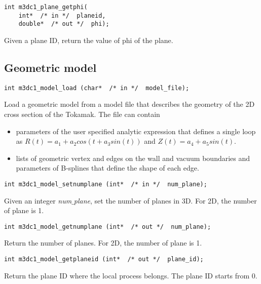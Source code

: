 \begin{verbatim}
int m3dc1_plane_getphi(
    int*  /* in */  planeid, 
    double*  /* out */  phi);
\end{verbatim}\vspace{-.5cm}\hspace{1cm}
Given a plane ID, return the value of phi of the plane.

\subsection{Geometric model}

\begin{verbatim}
int m3dc1_model_load (char*  /* in */  model_file);
\end{verbatim}\vspace{-.5cm}\hspace{1cm}
Load a geometric model from a model file that describes the geometry of the 2D cross section of the Tokamak. The file can contain
\begin{itemize}
\item parameters of the user specified analytic expression that defines a single loop as $R(t)=a_1 + a_2cos\left(t + a_3sin(t)\right)$ and $Z(t)= a_4 + a_5sin(t)$.
\item lists of geometric vertex and edges on the wall and vacuum boundaries and parameters of B-splines that define the shape of each edge.
\end{itemize}

\begin{verbatim}
int m3dc1_model_setnumplane (int*  /* in */  num_plane);
\end{verbatim}\vspace{-.5cm}\hspace{1cm}
Given an integer \textit{num$\_$plane}, set the number of planes in 3D. For 2D, the number of plane is 1.

\begin{verbatim}
int m3dc1_model_getnumplane (int*  /* out */  num_plane);
\end{verbatim}\vspace{-.5cm}\hspace{1cm}
Return the number of planes. For 2D, the number of plane is 1.

\begin{verbatim}
int m3dc1_model_getplaneid (int*  /* out */  plane_id);
\end{verbatim}\vspace{-.5cm}\hspace{1cm}
Return the plane ID where the local process belongs. The plane ID starts from 0.

